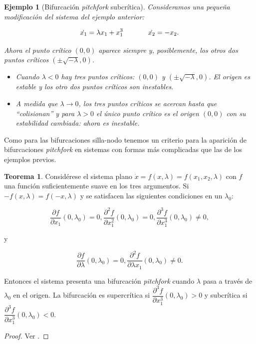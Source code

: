 \documentclass[11pt]{book}
\theoremstyle{definition}
\numberwithin{definition}{section}
\theoremstyle{theorem}
\newtheorem{theorem}{Teorema}
\numberwithin{theorem}{section}
\numberwithin{lemma}{section}
\numberwithin{corollary}{section}
\theoremstyle{plain}
\newtheorem{example}{Ejemplo}
\numberwithin{example}{section}
\begin{document}
\begin{example}[Bifurcación \textit{pitchfork} subcrítica]
Consideramos una pequeña modificación del sistema del ejemplo anterior:

$$ 
	\dot{x_1} = \lambda x_1 + x_1^3 \hspace{0.5in} \dot{x_2} = -x_2.
$$

Ahora el punto crítico $(0,0)$ aparece siempre y, posiblemente, los otros dos puntos críticos $(\pm \sqrt{-\lambda}, 0)$.

\begin{itemize}
	\item Cuando $\lambda < 0$ hay tres puntos críticos: $(0,0)$ y $(\pm \sqrt{-\lambda}, 0)$. El origen es estable y los otro dos puntos críticos son inestables.
	\item A medida que $\lambda \to 0$, los tres puntos críticos se acercan hasta que ``colisionan'' y para $\lambda > 0$ el único punto crítico es el origen $(0,0)$ con su estabilidad cambiada: ahora es inestable.
\end{itemize}


\end{example}

Como para las bifurcaciones silla-nodo tenemos un criterio para la aparición de bifurcaciones \textit{pitchfork} en sistemas con formas más complicadas que las de los ejemplos previos.

\begin{theorem}
Considérese el sistema plano $\dot{x} = f(x, \lambda) = f(x_1, x_2, \lambda)$ con $f$ una función suficientemente suave en los tres argumentos. Si $-f(x, \lambda) = f(-x, \lambda)$ y se satisfacen las siguientes condiciones en un $\lambda_0$:

$$
	\dfrac{\partial f}{\partial x_1}(0, \lambda_0) = 0, \dfrac{\partial^2 f}{\partial x_1^2}(0, \lambda_0) = 0, 
	\dfrac{\partial^3 f}{\partial x_1^3}(0, \lambda_0) \neq 0, 
$$

y

$$
	\dfrac{\partial f}{\partial \lambda}(0, \lambda_0) = 0, \dfrac{\partial^2 f}{\partial \lambda x_1}(0, \lambda_0) \neq 0.
$$

Entonces el sistema presenta una bifurcación \textit{pitchfork} cuando $\lambda$ pasa a través de $\lambda_0$ en el origen.
La bifurcación es supercrítica si $\dfrac{\partial^3 f}{\partial x_1^3}(0,\lambda_0) > 0$ y subcrítica si $\dfrac{\partial^3 f}{\partial x_1^3}(0,\lambda_0) < 0$.
\begin{proof}
Ver \cite{strogatz,swiggins}.
\end{proof}
\end{theorem}
\end{document}
